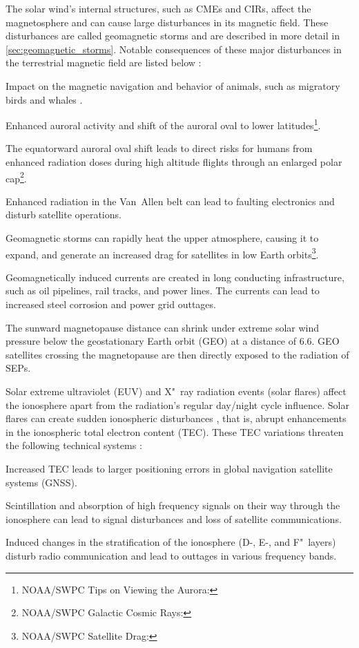 The solar wind's internal structures, such as CMEs and CIRs, affect the magnetosphere and can cause large disturbances in its magnetic field. These disturbances are called geomagnetic storms and are described in more detail in \autoref{sec:geomagnetic_storms}. Notable consequences of these major disturbances in the terrestrial magnetic field are listed below \citep{Bothmer2007}:
\begin{itemize*}
	\item Impact on the magnetic navigation and behavior of animals, such as migratory birds \citep{Moore1977} and whales \citep{Vanselow2017}.
	\item Enhanced auroral activity and shift of the auroral oval to lower latitudes\footnote{NOAA/SWPC Tips on Viewing the Aurora: }.
	\item The equatorward auroral oval shift leads to direct risks for humans from enhanced radiation doses during high altitude flights through an enlarged polar cap\footnote{NOAA/SWPC Galactic Cosmic Rays: }.
	\item Enhanced radiation in the Van~Allen belt can lead to faulting electronics and disturb satellite operations.
	\item Geomagnetic storms can rapidly heat the upper atmosphere, causing it to expand, and generate an increased drag for satellites in low Earth orbits\footnote{NOAA/SWPC Satellite Drag: }.
	\item Geomagnetically induced currents are created in long conducting infrastructure, such as oil pipelines, rail tracks, and power lines. The currents can lead to increased steel corrosion and power grid outtages.
	\item The sunward magnetopause distance can shrink under extreme solar wind pressure below the geostationary Earth orbit (GEO) at a distance of \SI{6.6}{\RE}. GEO satellites crossing the magnetopause are then directly exposed to the radiation of SEPs.
\end{itemize*}

Solar extreme ultraviolet (EUV) and X"~ray radiation events (solar flares) affect the ionosphere apart from the radiation's regular day/night cycle influence. Solar flares can create sudden ionospheric disturbances \citep{Gosling1993}, that is, abrupt enhancements in the ionospheric total electron content (TEC). These TEC variations threaten the following technical systems \citep{Kraaikamp2015}:
\begin{itemize*}
	\item Increased TEC leads to larger positioning errors in global navigation satellite systems (GNSS).
	\item Scintillation and absorption of high frequency signals on their way through the ionosphere can lead to signal disturbances and loss of satellite communications.
	\item Induced changes in the stratification of the ionosphere (D-, E-, and F"~layers) disturb radio communication and lead to outtages in various frequency bands.
\end{itemize*}

